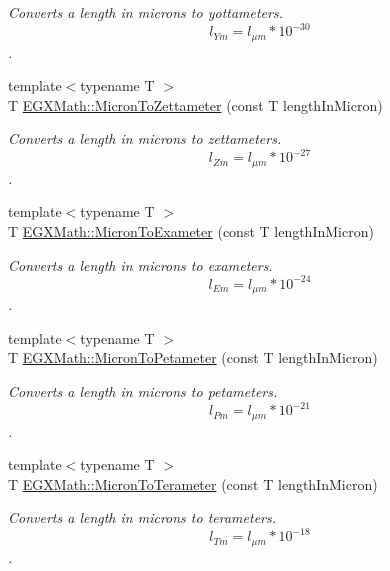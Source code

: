 \begin{DoxyCompactItemize}
\begin{DoxyCompactList}\small\item\em Converts a length in microns to yottameters. \[ l_{Ym}=l_{\mu m} * 10^{-30} \]. \end{DoxyCompactList}\item 
{\footnotesize template$<$typename T $>$ }\\T \mbox{\hyperlink{group___e_g_x_math-_conversions-_length_conversions-_non-_s_i-_micron-_s_i_gad70bec89cb8cae0a215e4f2c1b599c09}{E\+G\+X\+Math\+::\+Micron\+To\+Zettameter}} (const T length\+In\+Micron)
\begin{DoxyCompactList}\small\item\em Converts a length in microns to zettameters. \[ l_{Zm}=l_{\mu m} * 10^{-27} \]. \end{DoxyCompactList}\item 
{\footnotesize template$<$typename T $>$ }\\T \mbox{\hyperlink{group___e_g_x_math-_conversions-_length_conversions-_non-_s_i-_micron-_s_i_ga818e4c9f7eeb588ba87d5c16dba25fdd}{E\+G\+X\+Math\+::\+Micron\+To\+Exameter}} (const T length\+In\+Micron)
\begin{DoxyCompactList}\small\item\em Converts a length in microns to exameters. \[ l_{Em}=l_{\mu m} * 10^{-24} \]. \end{DoxyCompactList}\item 
{\footnotesize template$<$typename T $>$ }\\T \mbox{\hyperlink{group___e_g_x_math-_conversions-_length_conversions-_non-_s_i-_micron-_s_i_ga2260fe792831ea80f1d61c3b876d1f11}{E\+G\+X\+Math\+::\+Micron\+To\+Petameter}} (const T length\+In\+Micron)
\begin{DoxyCompactList}\small\item\em Converts a length in microns to petameters. \[ l_{Pm}=l_{\mu m} * 10^{-21} \]. \end{DoxyCompactList}\item 
{\footnotesize template$<$typename T $>$ }\\T \mbox{\hyperlink{group___e_g_x_math-_conversions-_length_conversions-_non-_s_i-_micron-_s_i_gaa71029484f59849bac474cfbeda0db5d}{E\+G\+X\+Math\+::\+Micron\+To\+Terameter}} (const T length\+In\+Micron)
\begin{DoxyCompactList}\small\item\em Converts a length in microns to terameters. \[ l_{Tm}=l_{\mu m} * 10^{-18} \]. \end{DoxyCompactList}\item 

\end{DoxyCompactItemize}
